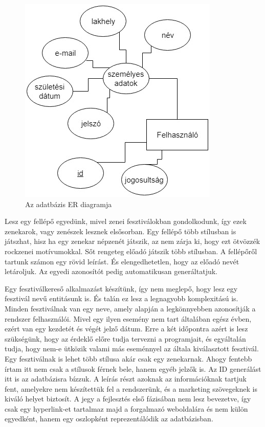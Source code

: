 \begin{figure}
\centering
\includegraphics[scale=0.6]{kepek/userER.jpg}
\caption{Az adatbázis ER diagramja}
\label{fig:usEr}
\end{figure}

Lesz egy fellépő egyedünk, mivel zenei fesztiválokban gondolkodunk, így ezek zenekarok, vagy zenészek lesznek elsősorban. Egy fellépő több stílusban is játszhat, hisz ha egy zenekar népzenét játszik, az nem zárja ki, hogy ezt ötvözzék rockzenei motívumokkal. Sőt rengeteg előadó játszik több stílusban. A fellépőről tartunk számon egy rövid leírást. És elengedhetetlen, hogy az előadó nevét letároljuk. Az egyedi azonosítót pedig automatikusan generáltatjuk. 

Egy fesztiválkereső alkalmazást készítünk, így nem meglepő, hogy lesz egy fesztivál nevű entitásunk is. És talán ez lesz a legnagyobb komplexitású is. Minden fesztiválnak van egy neve, amely alapján a legkönnyebben azonosítják a rendszer felhasználói. Mivel egy ilyen esemény nem tart általában egész évben, ezért van egy kezdetét és végét jelző dátum. Erre a két időpontra azért is lesz szükségünk, hogy az érdeklő előre tudja  tervezni a programjait, és egyáltalán tudja, hogy nem-e ütközik valami más eseménnyel az általa kiválasztott fesztivál. Egy fesztiválnak is lehet több stílusa akár csak egy zenekarnak. Ahogy fentebb írtam itt nem csak a stílusok férnek bele, hanem egyéb jelzők is. Az ID generálást itt is az adatbázisra bízzuk. A leírás részt azoknak az információknak tartjuk fent, amelyekre nem készítettük fel a rendszerünk, és a marketing szövegeknek is kiváló helyet biztosít. A jegy a fejlesztés első fázisában nem lesz bevezetve, így csak egy hyperlink-et tartalmaz majd a forgalmazó weboldalára és nem külön egyedként, hanem egy oszlopként reprezentálódik az adatbázisban.

